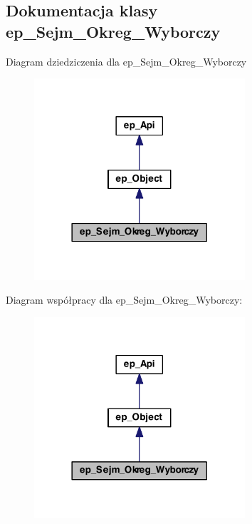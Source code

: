 \hypertarget{classep___sejm___okreg___wyborczy}{\subsection{Dokumentacja klasy ep\-\_\-\-Sejm\-\_\-\-Okreg\-\_\-\-Wyborczy}
\label{classep___sejm___okreg___wyborczy}
}


Diagram dziedziczenia dla ep\-\_\-\-Sejm\-\_\-\-Okreg\-\_\-\-Wyborczy\nopagebreak
\begin{figure}[H]
\begin{center}
\leavevmode
\includegraphics[width=222pt]{classep___sejm___okreg___wyborczy__inherit__graph}
\end{center}
\end{figure}


Diagram współpracy dla ep\-\_\-\-Sejm\-\_\-\-Okreg\-\_\-\-Wyborczy\-:\nopagebreak
\begin{figure}[H]
\begin{center}
\leavevmode
\includegraphics[width=222pt]{classep___sejm___okreg___wyborczy__coll__graph}
\end{center}
\end{figure}
